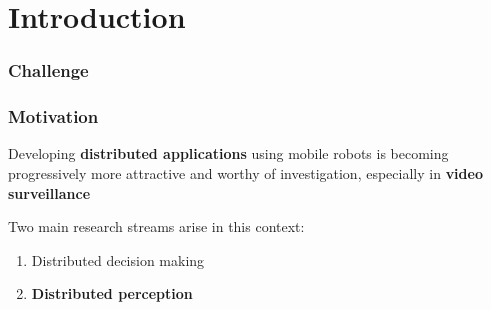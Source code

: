 \section{Introduction}

\begin{frame}
	\frametitle{Challenge}
	
	\begin{figure}
		\centering
	\end{figure}
\end{frame}

\begin{frame}
	\frametitle{Motivation}
	
	\Large
	
	Developing \textbf{distributed applications} using mobile robots is becoming progressively
	more attractive and worthy of investigation, especially in \textbf{video surveillance} \\
	
	\vspace{0.4cm}
	
	Two main research streams arise in this context:
	
	\begin{enumerate}
		\item Distributed decision making
		\item \textbf{Distributed perception}
	\end{enumerate}
\end{frame}

